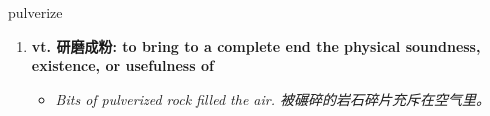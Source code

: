 
\begin{frame}
{\huge pulverize}
\begin{center}
\begin{enumerate}\Large
  \item \textbf{vt. 研磨成粉: to bring to a complete end the physical soundness, existence, or usefulness of}
  \begin{itemize}
    \item \em{\Large{Bits of pulverized rock filled the air. 被碾碎的岩石碎片充斥在空气里。}}
  \end{itemize}
\end{enumerate}
\end{center}
\end{frame}
